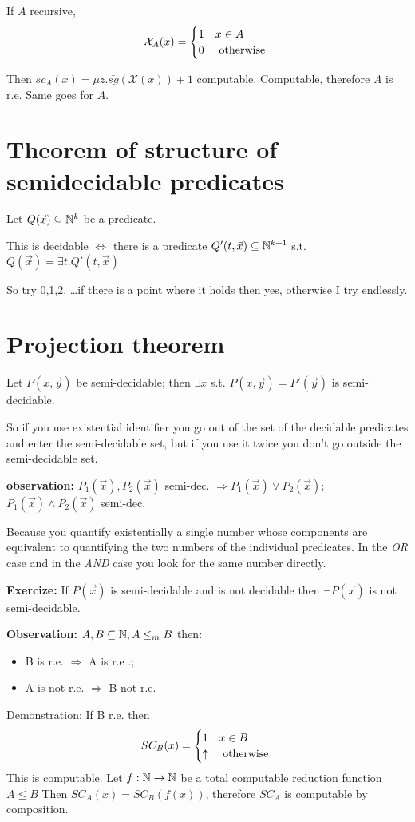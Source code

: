 If $A$ recursive, \begin{equation*} \mathcal{X}_A(x)=\begin{cases} 1 &
    x\in A \\ 0 & $ otherwise $
  \end{cases}
\end{equation*}

Then $ sc_A(x) = \mu z.\bar{sg}(\mathcal{X}(x)) + 1 $
computable. Computable, therefore \textit{A} is r.e. Same goes for $
\bar{A} $.

\section {Theorem of structure of semidecidable predicates}

Let $ Q(\vec{x}) \subseteq \mathbb{N}^k $ be a predicate.

This is decidable $ \Leftrightarrow $ there is a predicate $
Q'(t,\vec{x}) \subseteq \mathbb{N}^{k+1} $ s.t. $ Q(\vec{x}) = \exists
t. Q'(t,\vec{x}) $

So try 0,1,2, \dots if there is a point where it holds then yes,
otherwise I try endlessly.

\section {Projection theorem}

Let $ P(x,\vec{y}) $ be semi-decidable; then $ \exists x $ s.t. $
P(x,\vec{y}) = P'(\vec{y})$ is semi-decidable.

So if you use existential identifier you go out of the set of the
decidable predicates and enter the semi-decidable set, but if you use
it twice you don't go outside the semi-decidable set.

\textbf{observation:} $ P_1(\vec{x}), P_2(\vec{x}) $ semi-dec. $
\Rightarrow P_1(\vec{x}) \lor P_2(\vec{x}) $; $ P_1(\vec{x}) \land
P_2(\vec{x}) $ semi-dec.

Because you quantify existentially a single number whose components
are equivalent to quantifying the two numbers of the individual
predicates. In the \textit{OR} case and in the \textit{AND} case you
look for the same number directly.

\textbf{Exercize:} If $ P(\vec{x}) $ is semi-decidable and is not
decidable then $ \lnot P(\vec{x}) $ is not semi-decidable.

\textbf{Observation:} $ A,B \subseteq \mathbb{N}, A\leq_m B $ then:
\begin{itemize}
\item B is r.e. $ \Rightarrow $ A is r.e .;
\item A is not r.e. $ \Rightarrow $ B not r.e.
\end{itemize} Demonstration: If B r.e. then
\begin{equation*} SC_B(x) = \begin{cases} 1 & x \in B \\ \uparrow & $
    otherwise $
  \end{cases}
\end{equation*} This is computable. Let $ f:\mathbb{N}\rightarrow\mathbb{N} $ be a
total computable reduction function\\ $ A\leq B $ Then $ SC_A(x) =
SC_B(f(x)) $, therefore $ SC_A $ is computable by composition.

